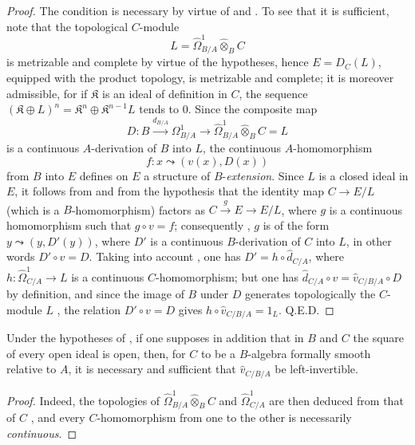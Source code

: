 \begin{proof}
The condition is necessary by virtue of  and . To see that it is sufficient, note that the topological $C$-module
\[
  L=\widehat{\Omega}^1_{B/A}\widehat{\otimes}_B C
\]
is metrizable and complete by virtue of the hypotheses, hence $E=D_C(L)$, equipped with the product topology, is
metrizable and complete; it is moreover admissible, for if $\mathfrak{K}$ is an ideal of definition in $C$, the sequence $(\mathfrak{K}\oplus L)^n=\mathfrak{K}^n\oplus\mathfrak{K}^{n-1}L$ tends to $0$. Since the composite map
\[
  D:B\xrightarrow{d_{B/A}}\Omega^1_{B/A}\longrightarrow
  \widehat{\Omega}^1_{B/A}\widehat{\otimes}_B C=L
\]
is a continuous $A$-derivation of $B$ into $L$, the continuous $A$-homomorphism
\[
  f:x\leadsto(v(x),D(x))
\]
from $B$ into $E$ defines on $E$ a structure of $B$-\emph{extension}. Since $L$ is a closed ideal in $E$, it follows from  and from the hypothesis that the identity map $C\to E/L$ (which is a $B$-homomorphism) factors as $C\xrightarrow{g}E\to E/L$, where $g$ is a continuous homomorphism such that $g\circ v=f$; consequently , $g$ is of the form $y\leadsto(y,D'(y))$, where $D'$ is a continuous $B$-derivation of $C$ into $L$, in other words $D'\circ v=D$. Taking into account , one has $D'=h\circ\widehat{d}_{C/A}$, where $h:\widehat{\Omega}^1_{C/A}\to L$ is a continuous $C$-homomorphism; but one has $\widehat{d}_{C/A}\circ v=\widehat{v}_{C/B/A}\circ D$ by definition, and since the image of $B$ under $D$ generates topologically the $C$-module $L$ , the relation $D'\circ v=D$ gives $h\circ\widehat{v}_{C/B/A}=1_L$.
\hfill Q.E.D.
\end{proof}

\begin{corollary}[20.7.19]
\label{0.20.7.19}
Under the hypotheses of \textup{}, if one supposes in addition that in $B$ and $C$ the square of every open ideal is open, then, for $C$ to be a $B$-algebra formally smooth relative to $A$, it is necessary and sufficient that $\widehat{v}_{C/B/A}$ be left-invertible.
\end{corollary}

\begin{proof}
Indeed, the topologies of $\widehat{\Omega}^1_{B/A}\widehat{\otimes}_B C$ and $\widehat{\Omega}^1_{C/A}$ are then deduced from that of $C$ , and every $C$-homomorphism from one to the other is necessarily \emph{continuous}.
\end{proof}

